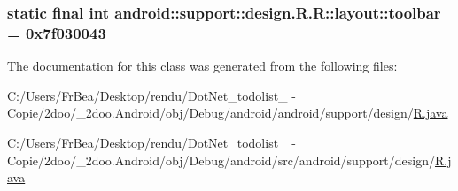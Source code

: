 \hypertarget{classandroid_1_1support_1_1design_1_1_r_1_1layout_28cc001023dd0777d11fbf9ccd15f830}{
\subsubsection[{toolbar}]{\setlength{\rightskip}{0pt plus 5cm}static final int android::support::design.R.R::layout::toolbar = 0x7f030043}}
\label{classandroid_1_1support_1_1design_1_1_r_1_1layout_28cc001023dd0777d11fbf9ccd15f830}




The documentation for this class was generated from the following files:\begin{CompactItemize}
\item 
C:/Users/FrBea/Desktop/rendu/DotNet\_\-todolist\_ - Copie/2doo/\_\-2doo.Android/obj/Debug/android/android/support/design/\hyperlink{android_2support_2design_2_r_8java}{R.java}\item 
C:/Users/FrBea/Desktop/rendu/DotNet\_\-todolist\_ - Copie/2doo/\_\-2doo.Android/obj/Debug/android/src/android/support/design/\hyperlink{src_2android_2support_2design_2_r_8java}{R.java}\end{CompactItemize}
